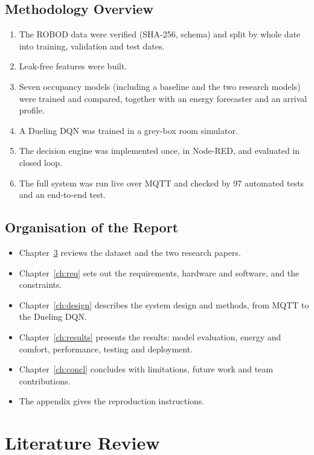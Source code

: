\documentclass[12pt,a4paper,oneside]{report}
\begin{document}
\section{Methodology Overview}
\begin{enumerate}
\item The ROBOD data were verified (SHA-256, schema) and split by whole date into training, validation and test
  dates.
\item Leak-free features were built.
\item Seven occupancy models (including a baseline and the two research models) were trained and compared, together
  with an energy forecaster and an arrival profile.
\item A Dueling DQN was trained in a grey-box room simulator.
\item The decision engine was implemented once, in Node-RED, and evaluated in closed loop.
\item The full system was run live over MQTT and checked by 97 automated tests and an end-to-end test.
\end{enumerate}

\section{Organisation of the Report}
\begin{itemize}
\item Chapter~\ref{ch:lit} reviews the dataset and the two research papers.
\item Chapter~\ref{ch:req} sets out the requirements, hardware and software, and the constraints.
\item Chapter~\ref{ch:design} describes the system design and methods, from MQTT to the Dueling DQN.
\item Chapter~\ref{ch:results} presents the results: model evaluation, energy and comfort, performance, testing and
  deployment.
\item Chapter~\ref{ch:concl} concludes with limitations, future work and team contributions.
\item The appendix gives the reproduction instructions.
\end{itemize}

\chapter{Literature Review}\label{ch:lit}
\end{document}

